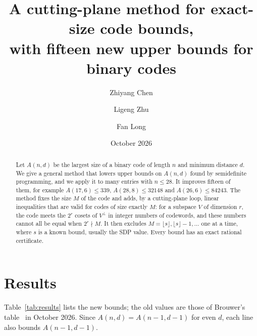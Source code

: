 \documentclass[11pt]{article}
\title{A cutting-plane method for exact-size code bounds,\\ with fifteen new upper bounds for binary codes}
\author{Zhiyang Chen \and Ligeng Zhu \and Fan Long}
\date{October 2026}
\theoremstyle{remark}
\begin{document}
\maketitle

\begin{abstract}
Let $A(n,d)$ be the largest size of a binary code of length $n$ and minimum distance $d$.
We give a general method that lowers upper bounds on $A(n,d)$ found by semidefinite programming, and we
apply it to many entries with $n\le28$. It improves fifteen of them, for example $A(17,6)\le 339$,
$A(28,8)\le 32148$ and $A(26,6)\le 84243$. The method fixes the size $M$ of the code and adds, by a cutting-plane
loop, linear inequalities that are valid for codes of size exactly $M$: for a subspace $V$ of dimension $r$, the code meets
the $2^r$ cosets of $V^\perp$ in integer numbers of codewords, and these numbers cannot all be equal when
$2^r\nmid M$. It then excludes $M=\lfloor s\rfloor,\lfloor s\rfloor-1,\dots$ one at a time, where $s$ is a known
bound, usually the SDP value. Every bound has an exact rational certificate.
\end{abstract}

\section{Results}

Table~\ref{tab:results} lists the new bounds; the old values are those of Brouwer's table~\cite{Br} in October 2026.
Since $A(n,d)=A(n-1,d-1)$ for even $d$, each line also bounds $A(n-1,d-1)$.
\end{document}
